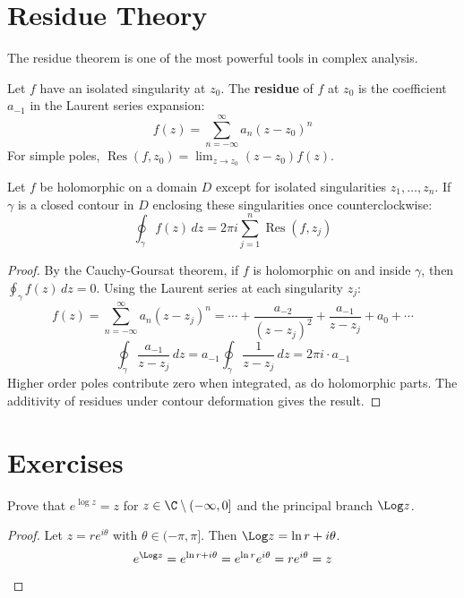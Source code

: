 \section{Residue Theory}
\label{sec:residue-theory}

The residue theorem is one of the most powerful tools in complex analysis.

\begin{definition}[Residue]
\label{def:residue}
Let $f$ have an isolated singularity at $z_0$. The \textbf{residue} of $f$ at $z_0$ is the coefficient $a_{-1}$ in the Laurent series expansion:
\[ f(z) = \sum_{n=-\infty}^\infty a_n (z - z_0)^n \]
For simple poles, $\operatorname{Res}(f, z_0) = \lim_{z \to z_0} (z - z_0) f(z)$.
\end{definition}

\begin{theorem}
\label{thm:residue-theorem}
Let $f$ be holomorphic on a domain $D$ except for isolated singularities $z_1, \ldots, z_n$. If $\gamma$ is a closed contour in $D$ enclosing these singularities once counterclockwise:
\[ \oint_\gamma f(z)\,dz = 2\pi i \sum_{j=1}^n \operatorname{Res}(f, z_j) \]
\end{theorem}

\begin{proof}
By the Cauchy-Goursat theorem, if $f$ is holomorphic on and inside $\gamma$, then $\oint_\gamma f(z)\,dz = 0$.
Using the Laurent series at each singularity $z_j$:
\[ f(z) = \sum_{n=-\infty}^\infty a_n (z - z_j)^n = \cdots + \frac{a_{-2}}{(z - z_j)^2} + \frac{a_{-1}}{z - z_j} + a_0 + \cdots \]
\[ \oint_\gamma \frac{a_{-1}}{z - z_j}\,dz = a_{-1} \oint_\gamma \frac{1}{z - z_j}\,dz = 2\pi i \cdot a_{-1} \]
Higher order poles contribute zero when integrated, as do holomorphic parts.
The additivity of residues under contour deformation gives the result.
\end{proof}

\section{Exercises}
\label{sec:complex-exercises}

\begin{exercise}
\label{ex:complex-log-exp}
Prove that $e^{\log z} = z$ for $z \in \C \setminus (-\infty, 0]$ and the principal branch $\Log z$.

\begin{proof}
Let $z = r e^{i\theta}$ with $\theta \in (-\pi, \pi]$. Then $\Log z = \ln r + i\theta$.
\[ e^{\Log z} = e^{\ln r + i\theta} = e^{\ln r} e^{i\theta} = r e^{i\theta} = z \]
\end{proof}
\end{exercise}


